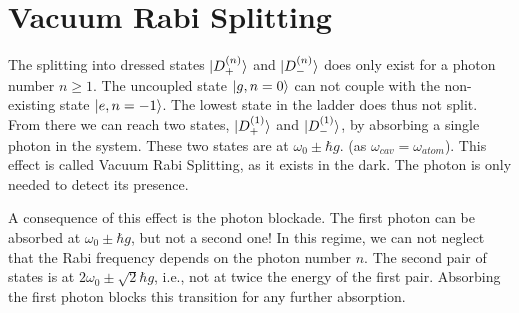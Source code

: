 

\section{Vacuum Rabi Splitting}

The splitting into dressed states $\ket{D_+^{(n)}}$ and $\ket{D_-^{(n)}}$ does only exist for a photon number $n \ge 1$. The uncoupled state $\ket{g, n=0}$ can not couple with the non-existing state   $\ket{e, n = -1}$. The lowest state in the ladder does thus not split. From there we can reach two states,  $\ket{D_+^{(1)}}$ and $\ket{D_-^{(1)}}$,
by absorbing a single photon in the system. These two states are at  $\omega_0 \pm \hbar g$. (as $\omega_{cav} = \omega_{atom}$). This effect is called Vacuum Rabi Splitting, as it exists in the dark. The photon is only needed to detect its presence.

A consequence of this effect is the photon blockade. The first photon can be absorbed at $\omega_0 \pm \hbar g$, but not a second one!  In this regime, we can not neglect that the Rabi frequency depends on the photon number $n$. The second pair of states is at 
$2 \omega_0 \pm \sqrt{2} \hbar g$, i.e., not at twice the energy of the first pair. Absorbing the first photon blocks this transition for any further absorption.


\printbibliography[segment=\therefsegment,heading=subbibliography]
